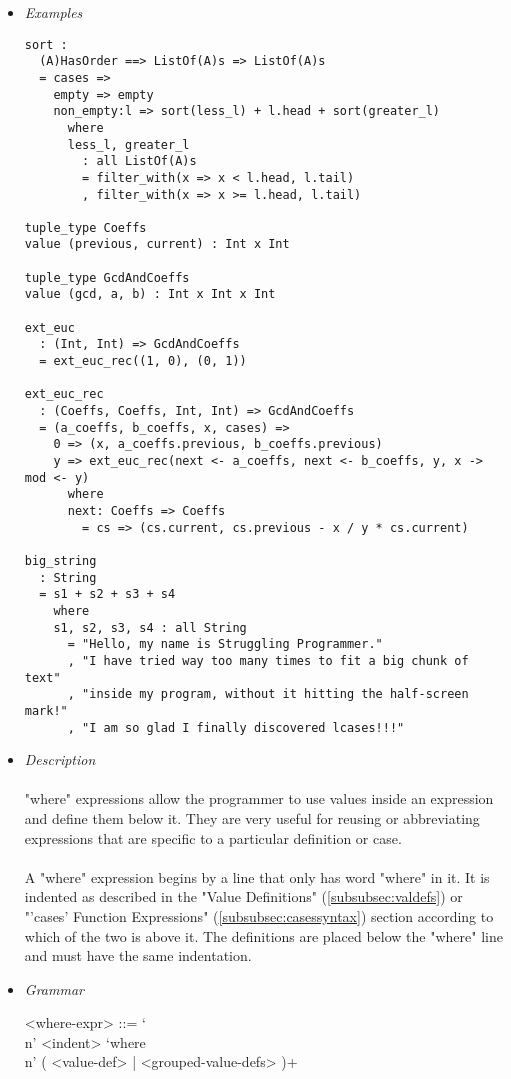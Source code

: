 \documentclass{article}
\begin{document}
\begin{itemize}

\item \textit{Examples}
\begin{verbatim}
sort :
  (A)HasOrder ==> ListOf(A)s => ListOf(A)s
  = cases => 
    empty => empty
    non_empty:l => sort(less_l) + l.head + sort(greater_l)
      where
      less_l, greater_l
        : all ListOf(A)s
        = filter_with(x => x < l.head, l.tail)
        , filter_with(x => x >= l.head, l.tail)

tuple_type Coeffs
value (previous, current) : Int x Int

tuple_type GcdAndCoeffs
value (gcd, a, b) : Int x Int x Int

ext_euc
  : (Int, Int) => GcdAndCoeffs
  = ext_euc_rec((1, 0), (0, 1))

ext_euc_rec
  : (Coeffs, Coeffs, Int, Int) => GcdAndCoeffs
  = (a_coeffs, b_coeffs, x, cases) =>
    0 => (x, a_coeffs.previous, b_coeffs.previous)
    y => ext_euc_rec(next <- a_coeffs, next <- b_coeffs, y, x -> mod <- y)
      where
      next: Coeffs => Coeffs
        = cs => (cs.current, cs.previous - x / y * cs.current)

big_string
  : String
  = s1 + s2 + s3 + s4
    where
    s1, s2, s3, s4 : all String
      = "Hello, my name is Struggling Programmer."
      , "I have tried way too many times to fit a big chunk of text"
      , "inside my program, without it hitting the half-screen mark!"
      , "I am so glad I finally discovered lcases!!!"
\end{verbatim}

\item \textit{Description}\\\\
"where" expressions allow the programmer to use values inside an expression and
define them below it. They are very useful for reusing or abbreviating
expressions that are specific to a particular definition or case.
\\\\
A "where" expression begins by a line that only has word "where" in it. It is
indented as described in the "Value Definitions" (\ref{subsubsec:valdefs}) or
"'cases' Function Expressions" (\ref{subsubsec:casessyntax}) section according
to which of the two is above it.  The definitions are placed below the "where"
line and must have the same indentation. 

\item \textit{Grammar}
\begin{grammar}
<where-expr> ::=
`\\n' <indent> `where\\n' ( <value-def> | <grouped-value-defs> )+
\end{grammar}

\end{itemize}
\end{document}
